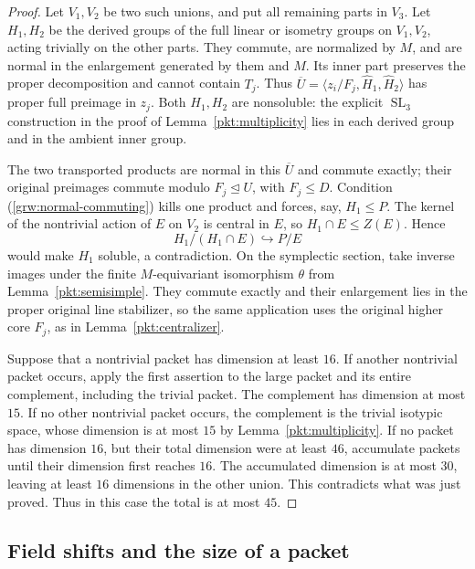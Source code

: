 \begin{proof}
Let $V_1,V_2$ be two such unions, and put all remaining parts
in $V_3$.  Let $H_1,H_2$ be the derived groups of the full
linear or isometry groups on $V_1,V_2$, acting trivially on the
other parts.  They commute, are normalized by $M$, and are
normal in the enlargement generated by them and $M$.
Its inner part preserves the proper decomposition and cannot
contain $T_j$.  Thus
$\overline U=\langle z_i/F_j,\widehat H_1,\widehat H_2\rangle$
has proper full preimage in $z_j$.  Both $H_1,H_2$ are
nonsoluble: the explicit
$\operatorname{SL}_3$ construction in the proof of
Lemma~\ref{pkt:multiplicity} lies in each derived group and in
the ambient inner group.

The two transported products are normal in this $\overline U$
and commute exactly; their original preimages commute modulo
$F_j\trianglelefteq U$, with $F_j\le D$.  Condition
\textup{(\ref{grw:normal-commuting})} kills one product and forces, say, $H_1\le P$.
The kernel
of the nontrivial action of $E$ on $V_2$ is central in $E$,
so $H_1\cap E\le Z(E)$.  Hence
\[
                 H_1/(H_1\cap E)\hookrightarrow P/E
\]
would make $H_1$ soluble, a contradiction.  On the symplectic
section, take inverse images under the finite $M$-equivariant
isomorphism $\theta$ from Lemma~\ref{pkt:semisimple}.
They commute exactly and their enlargement lies in the proper
original line stabilizer, so the same application uses the
original higher core $F_j$, as in Lemma~\ref{pkt:centralizer}.

Suppose that a nontrivial packet has dimension at least $16$.
If another nontrivial packet occurs, apply the first assertion
to the large packet and its entire complement, including the
trivial packet.  The complement has dimension at most $15$.
If no other nontrivial packet occurs, the complement is the
trivial isotypic space, whose dimension is at most $15$ by
Lemma~\ref{pkt:multiplicity}.
If no packet has dimension $16$, but their total dimension
were at least $46$, accumulate packets until their dimension
first reaches $16$.  The accumulated dimension is at most
$30$, leaving at least $16$ dimensions in the other union.
This contradicts what was just proved.  Thus in this case the
total is at most $45$.
\end{proof}

\subsection{Field shifts and the size of a packet}

